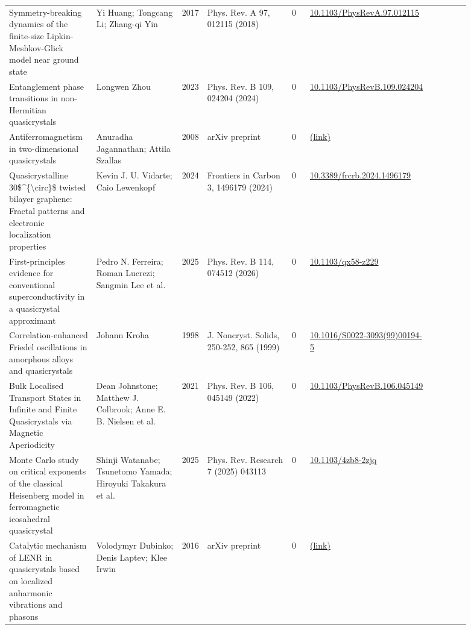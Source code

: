 \documentclass[10pt,a4paper]{article}
\begin{document}
{\begin{longtable}{p{0.192\linewidth}p{0.192\linewidth}p{0.043\linewidth}p{0.192\linewidth}p{0.043\linewidth}p{0.132\linewidth}p{0.096\linewidth}}
Symmetry-breaking dynamics of the finite-size Lipkin-Meshkov-Glick model near ground state & Yi Huang; Tongcang Li; Zhang-qi Yin & 2017 & Phys. Rev. A 97, 012115 (2018) & 0 & \href{https://doi.org/10.1103/PhysRevA.97.012115}{10.1103/PhysRevA.97.012115} &  \\
Entanglement phase transitions in non-Hermitian quasicrystals & Longwen Zhou & 2023 & Phys. Rev. B 109, 024204 (2024) & 0 & \href{https://doi.org/10.1103/PhysRevB.109.024204}{10.1103/PhysRevB.109.024204} &  \\
Antiferromagnetism in two-dimensional quasicrystals & Anuradha Jagannathan; Attila Szallas & 2008 & arXiv preprint & 0 & \href{http://arxiv.org/abs/0810.2312v1}{(link)} &  \\
Quasicrystalline 30\$\^{}\{\textbackslash{}circ\}\$ twisted bilayer graphene: Fractal patterns and electronic localization properties & Kevin J. U. Vidarte; Caio Lewenkopf & 2024 & Frontiers in Carbon 3, 1496179 (2024) & 0 & \href{https://doi.org/10.3389/frcrb.2024.1496179}{10.3389/frcrb.2024.1496179} &  \\
First-principles evidence for conventional superconductivity in a quasicrystal approximant & Pedro N. Ferreira; Roman Lucrezi; Sangmin Lee et al. & 2025 & Phys. Rev. B 114, 074512 (2026) & 0 & \href{https://doi.org/10.1103/qx58-z229}{10.1103/qx58-z229} &  \\
Correlation-enhanced Friedel oscillations in amorphous alloys and quasicrystals & Johann Kroha & 1998 & J. Noncryst. Solids, 250-252, 865 (1999) & 0 & \href{https://doi.org/10.1016/S0022-3093(99)00194-5}{10.1016/S0022-3093(99)00194-5} &  \\
Bulk Localised Transport States in Infinite and Finite Quasicrystals via Magnetic Aperiodicity & Dean Johnstone; Matthew J. Colbrook; Anne E. B. Nielsen et al. & 2021 & Phys. Rev. B 106, 045149 (2022) & 0 & \href{https://doi.org/10.1103/PhysRevB.106.045149}{10.1103/PhysRevB.106.045149} &  \\
Monte Carlo study on critical exponents of the classical Heisenberg model in ferromagnetic icosahedral quasicrystal & Shinji Watanabe; Tsunetomo Yamada; Hiroyuki Takakura et al. & 2025 & Phys. Rev. Research 7 (2025) 043113 & 0 & \href{https://doi.org/10.1103/4zb8-2zjq}{10.1103/4zb8-2zjq} &  \\
Catalytic mechanism of LENR in quasicrystals based on localized anharmonic vibrations and phasons & Volodymyr Dubinko; Denis Laptev; Klee Irwin & 2016 & arXiv preprint & 0 & \href{http://arxiv.org/abs/1609.06625v1}{(link)} &  \\

\end{longtable}}
\end{document}
